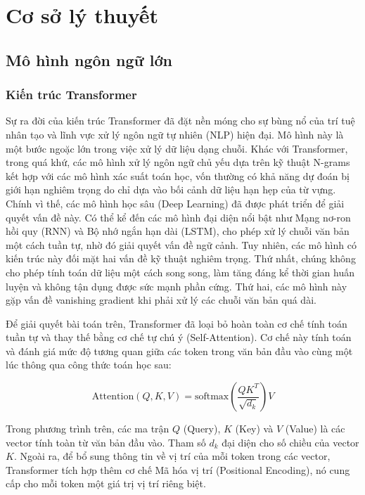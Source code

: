 \chapter{Cơ sở lý thuyết}

\section{Mô hình ngôn ngữ lớn}

\subsection{Kiến trúc Transformer}

Sự ra đời của kiến trúc Transformer đã đặt nền móng cho sự bùng nổ của trí tuệ nhân tạo và lĩnh vực xử lý ngôn ngữ tự nhiên (NLP) hiện đại. Mô hình này là một bước ngoặc lớn trong việc xử lý dữ liệu dạng chuỗi. Khác với Transformer, trong quá khứ, các mô hình xử lý ngôn ngữ chủ yếu dựa trên kỹ thuật N-grams kết hợp với các mô hình xác suất toán học, vốn thường có khả năng dự đoán bị giới hạn nghiêm trọng do chỉ dựa vào bối cảnh dữ liệu hạn hẹp của từ vựng. Chính vì thế, các mô hình học sâu (Deep Learning) đã được phát triển để giải quyết vấn đề này. Có thể kể đến các mô hình đại diện nổi bật như Mạng nơ-ron hồi quy (RNN) và Bộ nhớ ngắn hạn dài (LSTM), cho phép xử lý chuỗi văn bản một cách tuần tự, nhờ đó giải quyết vấn đề ngữ cảnh. Tuy nhiên, các mô hình có kiến trúc này đối mặt hai vấn đề kỹ thuật nghiêm trọng. Thứ nhất, chúng không cho phép tính toán dữ liệu một cách song song, làm tăng đáng kể thời gian huấn luyện và không tận dụng được sức mạnh phần cứng. Thứ hai, các mô hình này gặp vấn đề vanishing gradient khi phải xử lý các chuỗi văn bản quá dài.

Để giải quyết bài toán trên, Transformer đã loại bỏ hoàn toàn cơ chế tính toán tuần tự và thay thế bằng cơ chế tự chú ý (Self-Attention). Cơ chế này tính toán và đánh giá mức độ tương quan giữa các token trong văn bản đầu vào cùng một lúc thông qua công thức toán học sau:

\[
\text{Attention}(Q, K, V) = \text{softmax}\left(\frac{QK^T}{\sqrt{d_k}}\right)V
\]

Trong phương trình trên, các ma trận $Q$ (Query), $K$ (Key) và $V$ (Value) là các vector tính toàn từ văn bản đầu vào. Tham số $d_k$ đại diện cho số chiều của vector $K$. Ngoài ra, để bổ sung thông tin về vị trí của mỗi token trong các vector, Transformer tích hợp thêm cơ chế Mã hóa vị trí (Positional Encoding), nó cung cấp cho mỗi token một giá trị vị trí riêng biệt.

